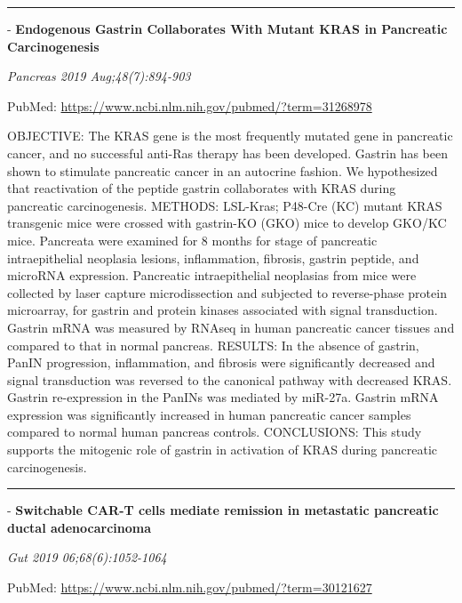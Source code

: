 \documentclass[]{article}
\begin{document}
{}

{}

\begin{center}\rule{0.5\linewidth}{\linethickness}\end{center}

 - \textbf{Endogenous Gastrin Collaborates With Mutant KRAS in
Pancreatic Carcinogenesis}

\emph{Pancreas 2019 Aug;48(7):894-903}

PubMed: \url{https://www.ncbi.nlm.nih.gov/pubmed/?term=31268978}

OBJECTIVE: The KRAS gene is the most frequently mutated gene in
pancreatic cancer, and no successful anti-Ras therapy has been
developed. Gastrin has been shown to stimulate pancreatic cancer in an
autocrine fashion. We hypothesized that reactivation of the peptide
gastrin collaborates with KRAS during pancreatic carcinogenesis.
METHODS: LSL-Kras; P48-Cre (KC) mutant KRAS transgenic mice were crossed
with gastrin-KO (GKO) mice to develop GKO/KC mice. Pancreata were
examined for 8 months for stage of pancreatic intraepithelial neoplasia
lesions, inflammation, fibrosis, gastrin peptide, and microRNA
expression. Pancreatic intraepithelial neoplasias from mice were
collected by laser capture microdissection and subjected to
reverse-phase protein microarray, for gastrin and protein kinases
associated with signal transduction. Gastrin mRNA was measured by RNAseq
in human pancreatic cancer tissues and compared to that in normal
pancreas. RESULTS: In the absence of gastrin, PanIN progression,
inflammation, and fibrosis were significantly decreased and signal
transduction was reversed to the canonical pathway with decreased KRAS.
Gastrin re-expression in the PanINs was mediated by miR-27a. Gastrin
mRNA expression was significantly increased in human pancreatic cancer
samples compared to normal human pancreas controls. CONCLUSIONS: This
study supports the mitogenic role of gastrin in activation of KRAS
during pancreatic carcinogenesis.

{}

{}

\begin{center}\rule{0.5\linewidth}{\linethickness}\end{center}

 - \textbf{Switchable CAR-T cells mediate remission in metastatic
pancreatic ductal adenocarcinoma}

\emph{Gut 2019 06;68(6):1052-1064}

PubMed: \url{https://www.ncbi.nlm.nih.gov/pubmed/?term=30121627}
\end{document}
